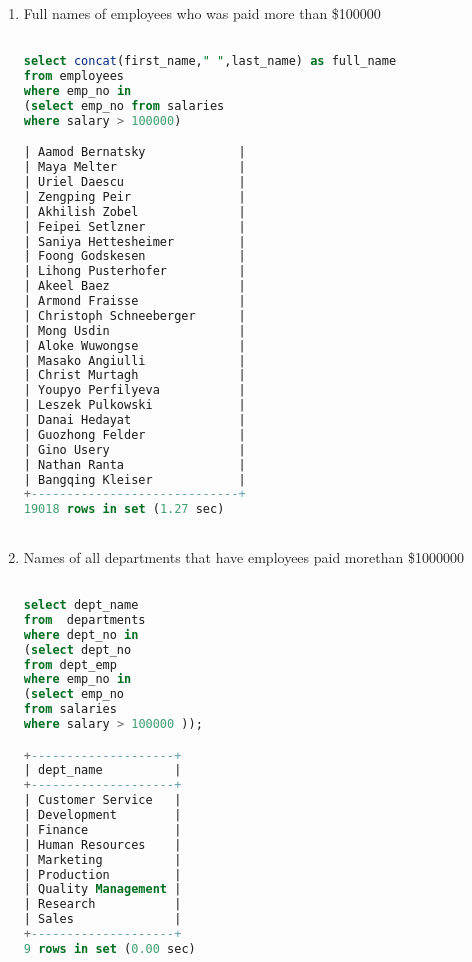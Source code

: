 \documentclass[12pt, letterpaper, twoside]{article}
\begin{document}
\begin{enumerate}
\item Full names of employees who was paid more than \$100000
\begin{lstlisting}[language=SQL]

select concat(first_name," ",last_name) as full_name
from employees 
where emp_no in 
(select emp_no from salaries
where salary > 100000)

| Aamod Bernatsky             |
| Maya Melter                 |
| Uriel Daescu                |
| Zengping Peir               |
| Akhilish Zobel              |
| Feipei Setlzner             |
| Saniya Hettesheimer         |
| Foong Godskesen             |
| Lihong Pusterhofer          |
| Akeel Baez                  |
| Armond Fraisse              |
| Christoph Schneeberger      |
| Mong Usdin                  |
| Aloke Wuwongse              |
| Masako Angiulli             |
| Christ Murtagh              |
| Youpyo Perfilyeva           |
| Leszek Pulkowski            |
| Danai Hedayat               |
| Guozhong Felder             |
| Gino Usery                  |
| Nathan Ranta                |
| Bangqing Kleiser            |
+-----------------------------+
19018 rows in set (1.27 sec)



\end{lstlisting}

\item Names of all departments that have employees paid morethan \$1000000
\begin{lstlisting}[language=SQL]

select dept_name 
from  departments
where dept_no in
(select dept_no 
from dept_emp 
where emp_no in
(select emp_no 
from salaries
where salary > 100000 ));

+--------------------+
| dept_name          |
+--------------------+
| Customer Service   |
| Development        |
| Finance            |
| Human Resources    |
| Marketing          |
| Production         |
| Quality Management |
| Research           |
| Sales              |
+--------------------+
9 rows in set (0.00 sec)


\end{lstlisting}

\end{enumerate}




 
\end{document}
